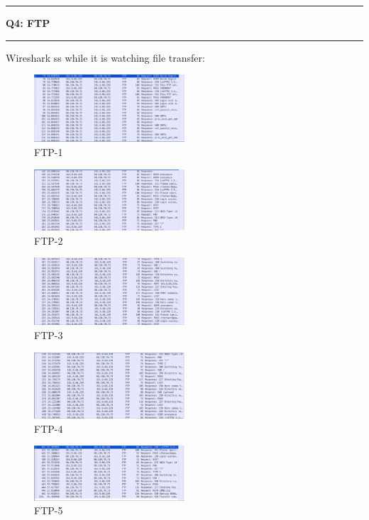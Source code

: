 \documentclass[11pt]{article}
\newcommand\question[2]{\vspace{.25in}\hrule\textbf{#1: #2}\vspace{.5em}\hrule\vspace{.10in}}
\begin{document}
	\question{Q4}{FTP}
	Wireshark ss while it is watching file transfer:
	
	\begin{figure}[H]
		\centering
		\includegraphics[width=0.5\textwidth]{images/ftp-1.png}
		\caption{FTP-1}
		\label{fig:FTP-1}
	\end{figure}
	\begin{figure}[H]
		\centering
		\includegraphics[width=0.5\textwidth]{images/ftp-2.png}
		\caption{FTP-2}
		\label{fig:FTP-2}
	\end{figure}
	\begin{figure}[H]
		\centering
		\includegraphics[width=0.5\textwidth]{images/ftp-3.png}
		\caption{FTP-3}
		\label{fig:FTP-3}
	\end{figure}
	\begin{figure}[H]
		\centering
		\includegraphics[width=0.5\textwidth]{images/ftp-4.png}
		\caption{FTP-4}
		\label{fig:FTP-4}
	\end{figure}
	\begin{figure}[H]
		\centering
		\includegraphics[width=0.5\textwidth]{images/ftp-5.png}
		\caption{FTP-5}
		\label{fig:FTP-5}
	\end{figure}
\end{document}
